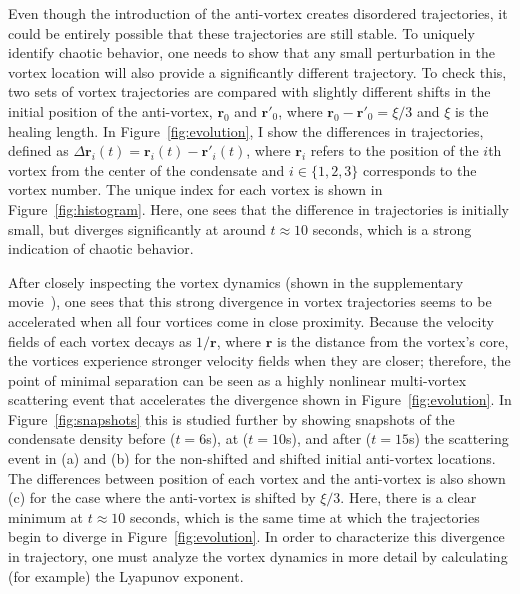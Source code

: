 Even though the introduction of the anti-vortex creates disordered trajectories, it could be entirely possible that these trajectories are still stable.
To uniquely identify chaotic behavior, one needs to show that any small perturbation in the vortex location will also provide a significantly different trajectory.
To check this, two sets of vortex trajectories are compared with slightly different shifts in the initial position of the anti-vortex, $\mathbf{r}_0$ and $\mathbf{r}'_0$, where $\mathbf{r}_0 - \mathbf{r}'_0 = \xi/3$ and $\xi$ is the healing length.
In Figure~\ref{fig:evolution}, I show the differences in trajectories, defined as $\Delta \mathbf{r}_i(t) = \mathbf{r}_{i}(t)-\mathbf{r}'_{i}(t)$, where $\mathbf{r}_i$ refers to the position of the $i$th vortex from the center of the condensate and $i\in \{1,2,3\}$ corresponds to the vortex number.
The unique index for each vortex is shown in Figure~\ref{fig:histogram}.
Here, one sees that the difference in trajectories is initially small, but diverges significantly at around $t \approx 10$ seconds, which is a strong indication of chaotic behavior.

After closely inspecting the vortex dynamics (shown in the supplementary movie~\cite{movie}), one sees that this strong divergence in vortex trajectories seems to be accelerated when all four vortices come in close proximity.
Because the velocity fields of each vortex decays as $1/\mathbf{r}$, where $\mathbf{r}$ is the distance from the vortex's core, the vortices experience stronger velocity fields when they are closer; therefore, the point of minimal separation can be seen as a highly nonlinear multi-vortex scattering event that accelerates the divergence shown in Figure~\ref{fig:evolution}.
In Figure~\ref{fig:snapshots} this is studied further by showing snapshots of the condensate density before ($t = 6$s), at ($t = 10$s), and after ($t = 15$s) the scattering event in (a) and (b) for the non-shifted and shifted initial anti-vortex locations.
The differences between position of each vortex and the anti-vortex is also shown (c) for the case where the anti-vortex is shifted by $\xi/3$.
Here, there is a clear minimum at $t \approx 10$ seconds, which is the same time at which the  trajectories begin to diverge in Figure~\ref{fig:evolution}.
In order to characterize this divergence in trajectory, one must analyze the vortex dynamics in more detail by calculating (for example) the Lyapunov exponent.


